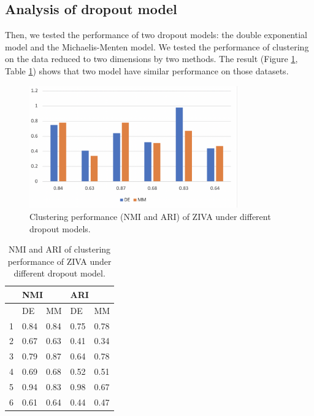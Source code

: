\subsection{Analysis of dropout model}
Then, we tested the performance of two dropout models: the double exponential model and the Michaelis-Menten model. We tested the performance of clustering on the data reduced to two dimensions by two methods. The result (Figure \ref{nbmmari}, Table \ref{tnbmm}) shows that two model have similar performance on those datasets.
\begin{figure}[htb!]
    \centering
    \includegraphics[width=0.8\textwidth]{figures/myfigures/nbmmari.png}
    \caption{Clustering performance (NMI and ARI) of ZIVA under different dropout models.}
    \label{nbmmari}
\end{figure}

\begin{table}[htb!]
\centering
\caption{NMI and ARI of clustering performance of ZIVA under different dropout model.}
\label{tnbmm}
\begin{tabular}{lllll}
\hline
  & \multicolumn{2}{l}{NMI} & \multicolumn{2}{l}{ARI} \\ \hline
  & DE         & MM         & DE         & MM         \\ \hline
1 & 0.84       & 0.84       & 0.75       & 0.78       \\
2 & 0.67       & 0.63       & 0.41       & 0.34       \\
3 & 0.79       & 0.87       & 0.64       & 0.78       \\
4 & 0.69       & 0.68       & 0.52       & 0.51       \\
5 & 0.94       & 0.83       & 0.98       & 0.67       \\
6 & 0.61       & 0.64       & 0.44       & 0.47       \\ \hline
\end{tabular}
\end{table}


